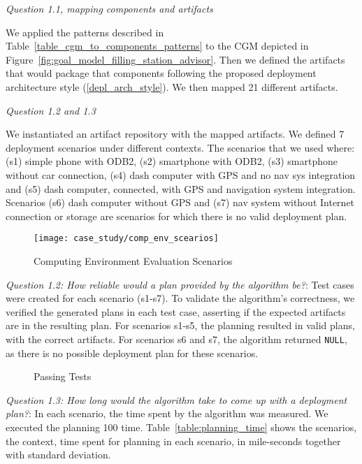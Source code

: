 \emph{Question 1.1, mapping components and artifacts }

We applied the patterns described in Table~\ref{table_cgm_to_components_patterns} to the CGM depicted in Figure~\ref{fig:goal_model_filling_station_advisor}. Then we defined the artifacts that would package that components following the proposed deployment architecture style (\ref{depl_arch_style}). We then mapped 21 different artifacts.

\emph{Question 1.2 and 1.3}

We instantiated an artifact repository with the mapped artifacts. We defined 7 deployment scenarios under different contexts. The scenarios that we used where: (s1) simple phone with ODB2, (s2) smartphone with ODB2, (s3) smartphone without car connection, (s4) dash computer with GPS and no nav sys integration and (s5) dash computer, connected, with GPS and navigation system integration. Scenarios (s6) dash computer without GPS and (s7) nav system without Internet connection or storage are scenarios for which there is no valid deployment plan.

\begin{figure*}[!htb]
 \centering
 \texttt{[image: case\_study/comp\_env\_scearios]}
 \caption{Computing Environment Evaluation Scenarios}
\label{fig:variability_scenarios}
\end{figure*}

\emph{Question 1.2:  How reliable would a plan provided
by the algorithm be?}: Test cases were created for each scenario (s1-s7).
To validate the algorithm’s correctness,
we verified the generated plans in each test case, asserting if the expected artifacts are in the resulting plan.
For scenarios s1-s5, the planning resulted in valid plans, with the correct artifacts. For scenarios s6 and s7, the algorithm returned \texttt{NULL}, as there is no possible deployment plan for these scenarios.

\begin{figure*}[!htb]
  \centering
  \caption{Passing Tests}
\label{testcase}
\end{figure*}



\emph{Question 1.3: How long would the algorithm take to come up with a deployment plan?}: In each scenario, the time spent by the algorithm was measured. We executed the planning 100 time. Table~\ref{table:planning_time} shows the scenarios, the context, time spent for planning in each scenario, in mile-seconds together with standard deviation.

